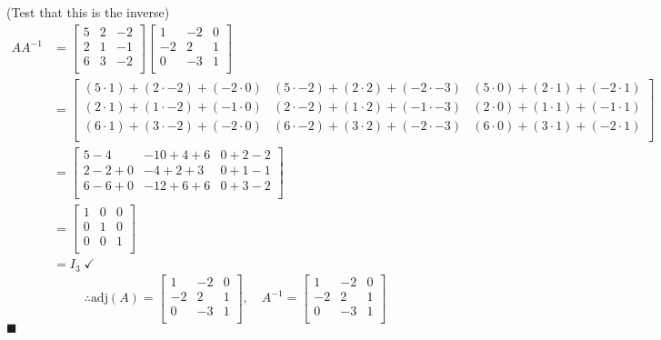 \documentclass{article}
\begin{document}
(Test that this is the inverse)
\begin{align*}
  A A^{-1} &=\begin{bmatrix}
    5 & 2 & -2   \\
    2 & 1 &- 1 \\
    6 & 3 & -2\\
    \end{bmatrix}\begin{bmatrix}
    1 &-2  &0   \\
     -2&2  &1   \\
     0&-3  &1   \\
  \end{bmatrix}\\
  &=\begin{bmatrix}
    (5\cdot1)+(2\cdot-2)+(-2\cdot0) &(5\cdot-2)+(2\cdot2)+(-2\cdot-3)  &(5\cdot0)+(2\cdot1)+(-2\cdot 1)   \\
     (2\cdot1)+(1\cdot-2)+(-1\cdot0)& (2\cdot-2)+(1\cdot2)+(-1\cdot-3) & (2\cdot0)+(1\cdot1)+(-1\cdot1)  \\
     (6\cdot1)+(3\cdot-2)+(-2\cdot0)&(6\cdot-2)+(3\cdot2)+(-2\cdot-3)  &(6\cdot0)+(3\cdot1)+(-2\cdot1)   \\
  \end{bmatrix}\\
  &=\begin{bmatrix}
    5-4 & -10+4+6 &  0+2-2 \\
     2-2+0& -4+2+3 &   0+1-1\\
     6-6+0& -12+6+6 &  0+3-2 \\
  \end{bmatrix}\\
  &=\begin{bmatrix}
    1 &0  &0   \\
    0 & 1 &  0 \\
     0&  0&1   \\
  \end{bmatrix}\\
  &=I_3\;\checkmark
\end{align*}
\[
  \therefore\text{adj}(A)=\begin{bmatrix}
    1 &-2  &0   \\
     -2&2  &1   \\
     0&-3  &1   \\
  \end{bmatrix},\quad A^{-1} =\begin{bmatrix}
    1 &-2  &0   \\
     -2&2  &1   \\
     0&-3  &1   \\
  \end{bmatrix} 
\]
\hfill\(\blacksquare\)
\end{document}
